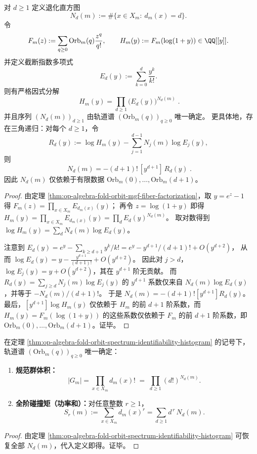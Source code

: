 \begin{theorem}\label{thm:op-algebra-fold-orbit-spectrum-identifiability-histogram}
对 \(d\ge 1\) 定义退化直方图
\[
N_d(m):=\#\{x\in X_m:\ d_m(x)=d\}.
\]
令
\[
F_m(z):=\sum_{q\ge 0}\mathrm{Orb}_m(q)\frac{z^q}{q!},
\qquad
H_m(y):=F_m(\log(1+y))\in\QQ[[y]].
\]
并定义截断指数多项式
\[
E_d(y):=\sum_{k=0}^{d}\frac{y^k}{k!}.
\]
则有严格因式分解
\[
\boxed{\;
H_m(y)=\prod_{d\ge 1}\bigl(E_d(y)\bigr)^{N_d(m)}\; }.
\]
并且序列 \((N_d(m))_{d\ge 1}\) 由轨道谱 \((\mathrm{Orb}_m(q))_{q\ge 0}\) 唯一确定。
更具体地，存在三角递归：对每个 \(d\ge 1\)，令
\[
R_d(y):=\log H_m(y)-\sum_{j=1}^{d-1}N_j(m)\log E_j(y),
\]
则
\[
\boxed{\;
N_d(m)=-(d+1)!\,[y^{d+1}]\,R_d(y)\; }.
\]
因此 \(N_d(m)\) 仅依赖于有限数据 \(\mathrm{Orb}_m(0),\dots,\mathrm{Orb}_m(d+1)\)。
\end{theorem}
\begin{proof}
由定理 \ref{thm:op-algebra-fold-orbit-mgf-fiber-factorization}，取 \(y=e^{z}-1\) 得
\(
F_m(z)=\prod_{x\in X_m}E_{d_m(x)}(y)
\)；
再令 \(z=\log(1+y)\) 即得
\(
H_m(y)=\prod_{x\in X_m}E_{d_m(x)}(y)=\prod_d E_d(y)^{N_d(m)}
\)。
取对数得到
\(
\log H_m(y)=\sum_d N_d(m)\log E_d(y)
\)。
\par
注意到
\(
E_d(y)=e^{y}-\sum_{k\ge d+1}y^k/k!
=e^{y}-y^{d+1}/(d+1)!+O(y^{d+2})
\)，
从而
\(
\log E_d(y)=y-\frac{y^{d+1}}{(d+1)!}+O(y^{d+2})
\)。
因此对 \(j>d\)，\(\log E_j(y)=y+O(y^{d+2})\)，其在 \(y^{d+1}\) 阶无贡献。
而
\(
R_d(y)=\sum_{j\ge d}N_j(m)\log E_j(y)
\)
的 \(y^{d+1}\) 系数仅来自 \(N_d(m)\log E_d(y)\)，并等于 \(-N_d(m)/(d+1)!\)。
于是 \(N_d(m)=-(d+1)![y^{d+1}]R_d(y)\)。
最后，\([y^{d+1}]\log H_m(y)\) 仅依赖于 \(H_m\) 的前 \(d+1\) 阶系数，而 \(H_m(y)=F_m(\log(1+y))\) 的这些系数仅依赖于 \(F_m\) 的前 \(d+1\) 阶系数，即 \(\mathrm{Orb}_m(0),\dots,\mathrm{Orb}_m(d+1)\)。证毕。
\end{proof}

\begin{corollary}\label{cor:op-algebra-fold-orbit-spectrum-reconstructs-gauge-volume-moments}
在定理 \ref{thm:op-algebra-fold-orbit-spectrum-identifiability-histogram} 的记号下，轨道谱 \((\mathrm{Orb}_m(q))_{q\ge 0}\) 唯一确定：
\begin{enumerate}
  \item \textbf{规范群体积：}
  \[
  |G_m|=\prod_{x\in X_m}d_m(x)!\;=\;\prod_{d\ge 1}(d!)^{N_d(m)}.
  \]
  \item \textbf{全阶碰撞矩（功率和）：}对任意整数 \(r\ge 1\)，
  \[
  S_r(m):=\sum_{x\in X_m}d_m(x)^r=\sum_{d\ge 1} d^{\,r}\,N_d(m).
  \]
\end{enumerate}
\end{corollary}
\begin{proof}
由定理 \ref{thm:op-algebra-fold-orbit-spectrum-identifiability-histogram} 可恢复全部 \(N_d(m)\)，代入定义即得。证毕。
\end{proof}

